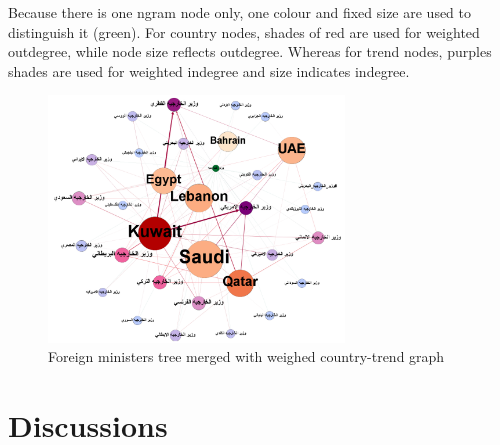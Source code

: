 \documentclass{comjnl}
\begin{document}
{Because there is one ngram node only, one colour and fixed size are used to distinguish it (green). For country nodes, shades of red are used for weighted outdegree, while node size reflects outdegree. Whereas for trend nodes, purples shades are used for weighted indegree and size indicates indegree.

\begin{figure}[htb] \centering
\includegraphics[width=0.7\textwidth]{images/ctn_graph.png}
\caption{Foreign ministers tree merged with weighed country-trend graph}
\label{fig:ctn_graph}
\end{figure}

\section{Discussions}\label{discussion}

}
\end{document}
